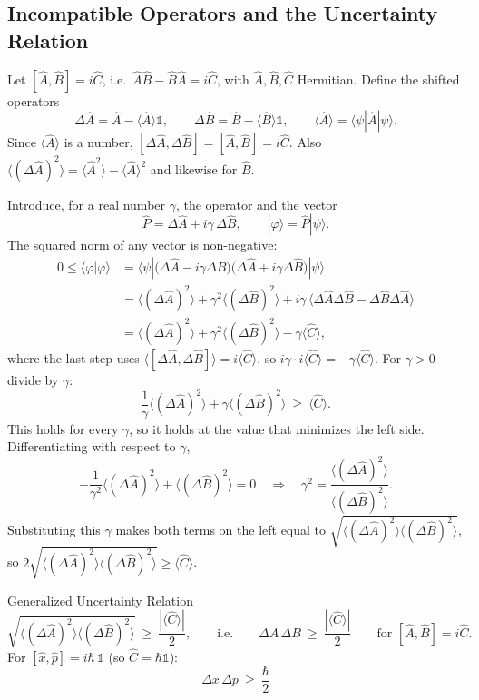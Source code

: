 \documentclass[11pt,a4paper]{article}
\begin{document}
\subsection{Incompatible Operators and the Uncertainty Relation}
Let $[\hat A,\hat B]=i\hat C$, i.e.\ $\hat A\hat B-\hat B\hat A=i\hat C$, with $\hat A,\hat B,\hat C$ Hermitian. Define the shifted operators
\[
\Delta\hat A=\hat A-\langle\hat A\rangle\mathbb 1,\qquad \Delta\hat B=\hat B-\langle\hat B\rangle\mathbb 1,\qquad \langle\hat A\rangle=\langle\psi|\hat A|\psi\rangle .
\]
Since $\langle\hat A\rangle$ is a number, $[\Delta\hat A,\Delta\hat B]=[\hat A,\hat B]=i\hat C$. Also $\langle(\Delta\hat A)^2\rangle=\langle\hat A^2\rangle-\langle\hat A\rangle^2$ and likewise for $\hat B$.

Introduce, for a real number $\gamma$, the operator and the vector
\[
\hat P=\Delta\hat A+i\gamma\,\Delta\hat B,\qquad |\varphi\rangle=\hat P|\psi\rangle .
\]
The squared norm of any vector is non-negative:
\begin{align*}
0\le\langle\varphi|\varphi\rangle&=\langle\psi|\big(\Delta\hat A-i\gamma\Delta\hat B\big)\big(\Delta\hat A+i\gamma\Delta\hat B\big)|\psi\rangle\\
&=\langle(\Delta\hat A)^2\rangle+\gamma^2\langle(\Delta\hat B)^2\rangle+i\gamma\,\langle\Delta\hat A\Delta\hat B-\Delta\hat B\Delta\hat A\rangle\\
&=\langle(\Delta\hat A)^2\rangle+\gamma^2\langle(\Delta\hat B)^2\rangle-\gamma\langle\hat C\rangle ,
\end{align*}
where the last step uses $\langle[\Delta\hat A,\Delta\hat B]\rangle=i\langle\hat C\rangle$, so $i\gamma\cdot i\langle\hat C\rangle=-\gamma\langle\hat C\rangle$. For $\gamma>0$ divide by $\gamma$:
\[
\frac1\gamma\langle(\Delta\hat A)^2\rangle+\gamma\langle(\Delta\hat B)^2\rangle\ \ge\ \langle\hat C\rangle .
\]
This holds for every $\gamma$, so it holds at the value that minimizes the left side. Differentiating with respect to $\gamma$,
\[
-\frac1{\gamma^2}\langle(\Delta\hat A)^2\rangle+\langle(\Delta\hat B)^2\rangle=0
\quad\Longrightarrow\quad
\gamma^2=\frac{\langle(\Delta\hat A)^2\rangle}{\langle(\Delta\hat B)^2\rangle}.
\]
Substituting this $\gamma$ makes both terms on the left equal to $\sqrt{\langle(\Delta\hat A)^2\rangle\langle(\Delta\hat B)^2\rangle}$, so
$2\sqrt{\langle(\Delta\hat A)^2\rangle\langle(\Delta\hat B)^2\rangle}\ge\langle\hat C\rangle$.

\begin{thm}{Generalized Uncertainty Relation}
\[
\sqrt{\langle(\Delta\hat A)^2\rangle\langle(\Delta\hat B)^2\rangle}\ \ge\ \frac{|\langle\hat C\rangle|}{2},
\qquad\text{i.e.}\qquad \Delta A\,\Delta B\ \ge\ \frac{|\langle\hat C\rangle|}2\qquad\text{for }[\hat A,\hat B]=i\hat C .
\]
For $[\hat x,\hat p]=i\hbar\,\mathbb 1$ (so $\hat C=\hbar\mathbb 1$):
\[
\boxed{\ \Delta x\,\Delta p\ \ge\ \frac\hbar2\ }
\]
\end{thm}
\end{document}
